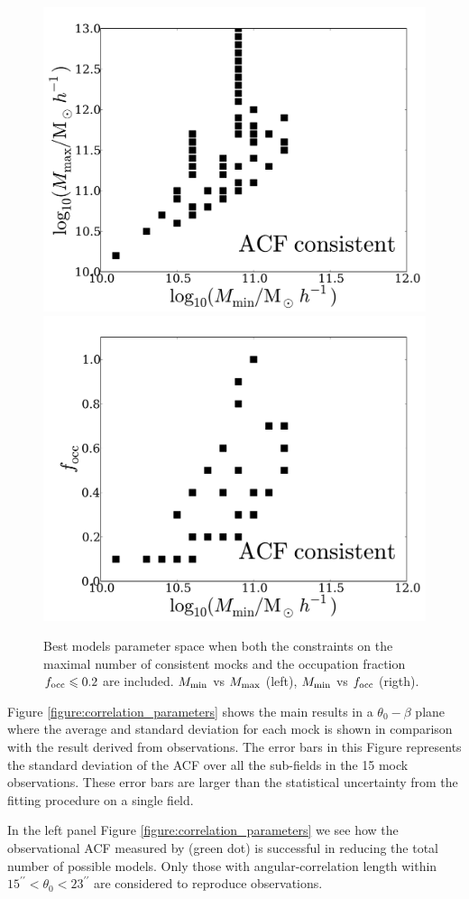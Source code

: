 \documentclass[usenatbib]{mn2e}
\begin{document}
\begin{figure}
\begin{center}
\includegraphics[width=0.46\linewidth,angle=0]{./plots/Fig6_mass.pdf}
\hspace{5mm}
\includegraphics[width=0.46\linewidth,angle=0]{./plots/Fig6_f_occ.pdf}
\end{center}
\caption{Best models parameter space when both the constraints on the
  maximal number of  consistent mocks and the occupation  fraction
  $f_{\rm occ}\leq  0.2$ are included. $M_{\rm min}$ vs $M_{\rm max}$
  (left), $M_{\rm min}$ vs $f_{\rm occ}$ (rigth).
  \label{fig:restriction_mock_and_f_occ_corr}} 
\end{figure} 


Figure \ref{figure:correlation_parameters} shows the main results in a
$\theta_{0}-\beta$  plane where the average and standard deviation
for each mock is shown in comparison with the result derived from
observations.  The error bars in this Figure represents the standard
deviation of the ACF over all the sub-fields in the 15 mock
observations. These error bars are larger than the statistical
uncertainty from the fitting procedure on a single field.

In the left panel Figure \ref{figure:correlation_parameters} we see how
the observational ACF measured by \cite{Hayashino2004} (green dot) is
successful in reducing the total number of possible models. Only those
with angular-correlation length within
$15^{\prime\prime}<\theta_{0}<23^{\prime\prime}$ are considered to
reproduce observations.    
\end{document}
